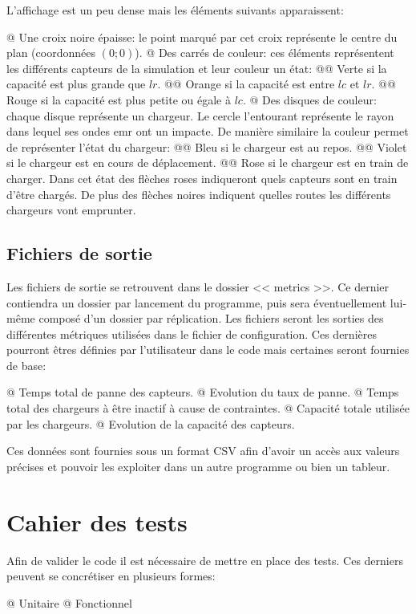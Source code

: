 \documentclass[final]{polytech/polytech}
\begin{document}
			L'affichage est un peu dense mais les éléments suivants apparaissent:
			\begin{easylist}
				@ Une croix noire épaisse: le point marqué par cet croix représente le centre du plan (coordonnées $\left(0;0\right)$).
				@ Des carrés de couleur: ces éléments représentent les différents capteurs de la simulation et leur couleur un état:
				@@ Verte si la capacité est plus grande que $lr$.
				@@ Orange si la capacité est entre $lc$ et $lr$.
				@@ Rouge si la capacité est plus petite ou égale à $lc$.
				@ Des disques de couleur: chaque disque représente un chargeur. Le cercle l'entourant représente le rayon dans lequel ses ondes \gls{emr} ont un impacte. De manière similaire la couleur permet de représenter l'état du chargeur:
				@@ Bleu si le chargeur est au repos.
				@@ Violet si le chargeur est en cours de déplacement.
				@@ Rose si le chargeur est en train de charger. Dans cet état des flèches roses indiqueront quels capteurs sont en train d'être chargés.
				De plus des flèches noires indiquent quelles routes les différents chargeurs vont emprunter.
			\end{easylist}

	\section{Fichiers de sortie\label{sec:csvoutput}}
		Les fichiers de sortie se retrouvent dans le dossier << metrics >>.
		Ce dernier contiendra un dossier par lancement du programme, puis sera éventuellement lui-même composé d'un dossier par réplication.
		Les fichiers seront les sorties des différentes métriques utilisées dans le fichier de configuration.
		Ces dernières pourront êtres définies par l'utilisateur dans le code mais certaines seront fournies de base:
		\begin{easylist}[itemize]
			@ Temps total de panne des capteurs.
			@ Evolution du taux de panne.
			@ Temps total des chargeurs à être inactif à cause de contraintes.
			@ Capacité totale utilisée par les chargeurs.
			@ Evolution de la capacité des capteurs.
		\end{easylist}
		
		Ces données sont fournies sous un format CSV afin d'avoir un accès aux valeurs précises et pouvoir les exploiter dans un autre programme ou bien un tableur.

\chapter{Cahier des tests}
	Afin de valider le code il est nécessaire de mettre en place des tests.
	Ces derniers peuvent se concrétiser en plusieurs formes:
	\begin{easylist}
		@ Unitaire
		@ Fonctionnel	
	\end{easylist}
\end{document}
